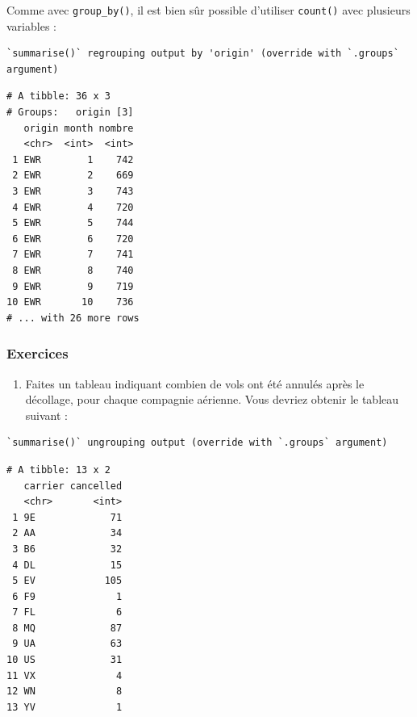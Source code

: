 \documentclass[
  a4paper,
]{article}
\newenvironment{Shaded}{\begin{snugshade}}{\end{snugshade}}
\newcommand{\DataTypeTok}[1]{\textcolor[rgb]{0.00,0.34,0.68}{#1}}
\newcommand{\KeywordTok}[1]{\textcolor[rgb]{0.12,0.11,0.11}{\textbf{#1}}}
\newcommand{\NormalTok}[1]{\textcolor[rgb]{0.12,0.11,0.11}{#1}}
\newcommand{\OperatorTok}[1]{\textcolor[rgb]{0.12,0.11,0.11}{#1}}
\newcommand{\StringTok}[1]{\textcolor[rgb]{0.75,0.01,0.01}{#1}}
\providecommand{\tightlist}{%
  \setlength{\itemsep}{0pt}\setlength{\parskip}{0pt}}
\begin{document}
Comme avec \texttt{group\_by()}, il est bien sûr possible d'utiliser \texttt{count()} avec plusieurs variables :

\begin{Shaded}
\end{Shaded}

\begin{verbatim}
`summarise()` regrouping output by 'origin' (override with `.groups` argument)
\end{verbatim}

\begin{verbatim}
# A tibble: 36 x 3
# Groups:   origin [3]
   origin month nombre
   <chr>  <int>  <int>
 1 EWR        1    742
 2 EWR        2    669
 3 EWR        3    743
 4 EWR        4    720
 5 EWR        5    744
 6 EWR        6    720
 7 EWR        7    741
 8 EWR        8    740
 9 EWR        9    719
10 EWR       10    736
# ... with 26 more rows
\end{verbatim}

\hypertarget{Exo-11}{%
\subsubsection{Exercices}\label{Exo-11}}

\begin{enumerate}
\def\labelenumi{\arabic{enumi}.}
\tightlist
\item
  Faites un tableau indiquant combien de vols ont été annulés après le décollage, pour chaque compagnie aérienne. Vous devriez obtenir le tableau suivant :
\end{enumerate}

\begin{verbatim}
`summarise()` ungrouping output (override with `.groups` argument)
\end{verbatim}

\begin{verbatim}
# A tibble: 13 x 2
   carrier cancelled
   <chr>       <int>
 1 9E             71
 2 AA             34
 3 B6             32
 4 DL             15
 5 EV            105
 6 F9              1
 7 FL              6
 8 MQ             87
 9 UA             63
10 US             31
11 VX              4
12 WN              8
13 YV              1
\end{verbatim}
\end{document}
